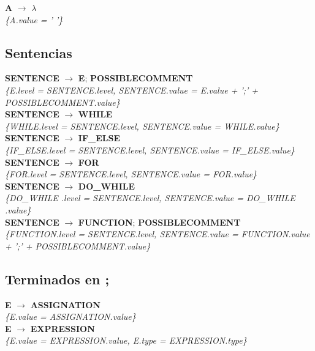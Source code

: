 \documentclass[10pt,a4paper]{article}
\begin{document}
\textbf{A} $\rightarrow$ $\lambda$ \\
\textit{\{A.value = ' '\}} \\

\subsection{Sentencias}
\textbf{SENTENCE} $\rightarrow$ \textbf{E}; \textbf{POSSIBLECOMMENT}\\ 
\textit{\{E.level = SENTENCE.level, SENTENCE.value = E.value + ';' + POSSIBLECOMMENT.value\}} \\

\textbf{SENTENCE} $\rightarrow$ \textbf{WHILE} \\ 
\textit{\{WHILE.level = SENTENCE.level, SENTENCE.value = WHILE.value\}} \\

\textbf{SENTENCE} $\rightarrow$ \textbf{IF\_ELSE}  \\ 
\textit{\{IF\_ELSE.level = SENTENCE.level, SENTENCE.value = IF\_ELSE.value\}} \\

\textbf{SENTENCE} $\rightarrow$ \textbf{FOR} \\ 
\textit{\{FOR.level = SENTENCE.level, SENTENCE.value = FOR.value\}} \\

\textbf{SENTENCE} $\rightarrow$ \textbf{DO\_WHILE} \\ 
\textit{\{DO\_WHILE .level = SENTENCE.level, SENTENCE.value = DO\_WHILE .value\}}  \\

\textbf{SENTENCE} $\rightarrow$ \textbf{FUNCTION}; \textbf{POSSIBLECOMMENT} \\
\textit{\{FUNCTION.level = SENTENCE.level, SENTENCE.value = FUNCTION.value + ';' + POSSIBLECOMMENT.value\}} \\

\subsection{Terminados en ;}

\textbf{E} $\rightarrow$ \textbf{ASSIGNATION}\\
\textit{\{E.value = ASSIGNATION.value\}}\\

\textbf{E} $\rightarrow$ \textbf{EXPRESSION} \\
\textit{\{E.value = EXPRESSION.value, E.type = EXPRESSION.type\}} \\
\end{document}
